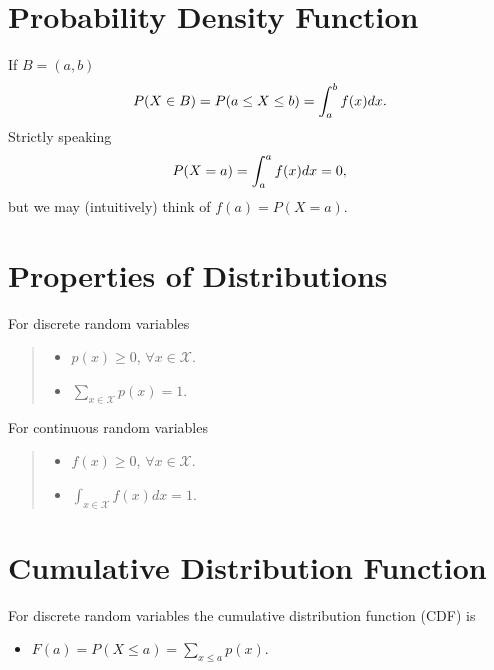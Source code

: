\documentclass[letterpaper,10pt,english]{sphinxmanual}
\begin{document}
\section{Probability Density Function}
\label{probability:probability-density-function}
If $B = (a,b)$
\begin{gather}
\begin{split}P(X \in B) = P(a \leq X \leq b) = \int_a^b f(x) dx.\end{split}\notag
\end{gather}
Strictly speaking
\begin{gather}
\begin{split}P(X = a) = \int_a^a f(x) dx = 0,\end{split}\notag
\end{gather}
but we may (intuitively) think of $f(a) = P(X=a)$.


\section{Properties of Distributions}
\label{probability:properties-of-distributions}
For discrete random variables
\begin{quote}
\begin{itemize}
\item {} 
$p(x) \geq 0$, $\forall x \in \mathcal{X}$.

\end{itemize}
\begin{itemize}
\item {} 
$\sum_{x\in \mathcal{X}} p(x) = 1$.

\end{itemize}
\end{quote}

For continuous random variables
\begin{quote}
\begin{itemize}
\item {} 
$f(x) \geq 0$, $\forall x \in \mathcal{X}$.

\end{itemize}
\begin{itemize}
\item {} 
$\int_{x\in \mathcal{X}} f(x)dx = 1$.

\end{itemize}
\end{quote}


\section{Cumulative Distribution Function}
\label{probability:cumulative-distribution-function}
For discrete random variables the cumulative distribution function
(CDF) is
\begin{itemize}
\item {} 
$F(a) = P(X \leq a) = \sum_{x \leq a} p(x).$

\end{itemize}
\end{document}
